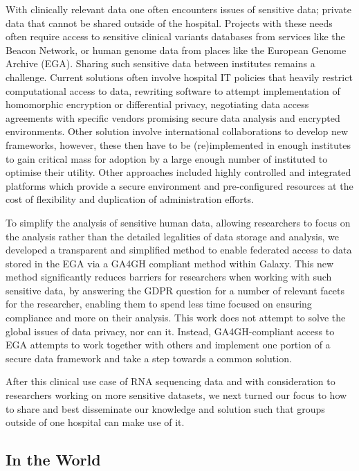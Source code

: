 With clinically relevant data one often encounters issues of sensitive data; private data that cannot be shared outside of the hospital. Projects with these needs often require access to sensitive clinical variants databases from services like the Beacon Network\cite{Rambla_2022}, or human genome data from places like the European Genome Archive (EGA)\cite{Freeberg_2021}. Sharing such sensitive data between institutes remains a challenge. Current solutions often involve hospital IT policies that heavily restrict computational access to data, rewriting software to attempt implementation of homomorphic encryption or differential privacy\cite{Mohammed_Yakubu_2019}, negotiating data access agreements with specific vendors promising secure data analysis and encrypted environments\cite{Carter_2019,Tang_2016}. Other solution involve international collaborations to develop new frameworks, however, these then have to be (re)implemented in enough institutes to gain critical mass\cite{Rehm_2021} for adoption by a large enough number of instituted to optimise their utility. Other approaches included highly controlled and integrated platforms which provide a secure environment and pre-configured resources at the cost of flexibility and duplication of administration efforts\cite{Schatz_2022}.

To simplify the analysis of sensitive human data, allowing researchers to focus on the analysis rather than the detailed legalities of data storage and analysis, we developed a transparent and simplified method to enable federated access to data stored in the EGA via a GA4GH compliant method within Galaxy. This new method significantly reduces barriers for researchers when working with such sensitive data, by answering the GDPR question for a number of relevant facets for the researcher, enabling them to spend less time focused on ensuring compliance and more on their analysis. This work does not attempt to solve the global issues of data privacy, nor can it. Instead, GA4GH-compliant access to EGA attempts to work together with others and implement one portion of a secure data framework and take a step towards a common solution.

After this clinical use case of RNA sequencing data and with consideration to researchers working on more sensitive datasets, we next turned our focus to how to share and best disseminate our knowledge and solution such that groups outside of one hospital can make use of it.


\subsection{In the World}

